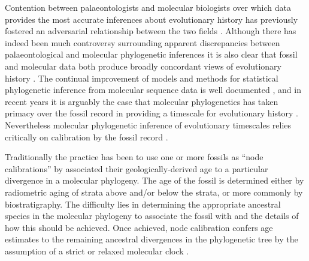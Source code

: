 \documentclass[11pt]{article}
\begin{document}
Contention between palaeontologists and molecular biologists over which data provides the most accurate inferences about evolutionary history has previously fostered an adversarial relationship between the two fields \autocite{Donoghue2007}. 
Although there has indeed been much controversy surrounding apparent discrepancies between palaeontological and molecular phylogenetic inferences \autocite{BromhamPenny2003} it is also clear that fossil and molecular data both produce broadly concordant views of evolutionary history \autocite{BentonAyala2003}. 
The continual improvement of models and methods for statistical phylogenetic inference from molecular sequence data is well documented \autocite[e.g.][]{Felsenstein2004,Yang:2006yu}, and in recent years it is arguably the case that molecular phylogenetics has taken primacy over the fossil record in providing a timescale for evolutionary history \autocite{Donoghue2007}. Nevertheless molecular phylogenetic inference of evolutionary timescales relies critically on calibration by the fossil record \autocite{Donoghue2007}.


Traditionally the practice has been to use one or more fossils as ``node calibrations'' by associated their geologically-derived age to a particular divergence in a molecular phylogeny. The age of the fossil is determined either by radiometric aging of strata above and/or below the strata, or more commonly by biostratigraphy. The difficulty lies in determining the appropriate ancestral species in the molecular phylogeny to associate the fossil with and the details of how this should be achieved. Once achieved, node calibration confers age estimates to the remaining ancestral divergences in the phylogenetic tree by the assumption of a strict or relaxed molecular clock \autocite{Thorne1998,thorne2005,yang2006,Drummond2006}. 
\end{document}

